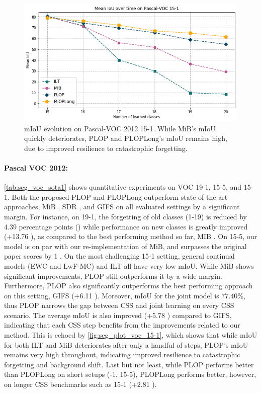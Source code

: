 


\begin{figure}
    \centering
    \includegraphics[width=0.7\linewidth]{images/seg/voc_15-1.png}
    \caption{\ac{mIoU} evolution on Pascal-VOC 2012 15-1. While MiB's \ac{mIoU} quickly
        deteriorates, PLOP and PLOPLong's \ac{mIoU} remains high, due to improved resilience to
        catastrophic forgetting.}
    \label{fig:seg_plot_voc_15-1}
\end{figure}




\paragraph{Pascal VOC 2012:} \autoref{tab:seg_voc_sota1} shows quantitative experiments on VOC 19-1,
15-5, and 15-1. Both the proposed PLOP and PLOPLong outperform state-of-the-art approaches, MiB
\citep{cermelli2020modelingthebackground}, SDR \citep{michieli2021sdr}, and GIFS
\citep{cermelli2020fewshotcontinualsegm} on all evaluated settings by a significant margin. For
instance, on 19-1, the forgetting of old classes (1-19) is reduced by 4.39 percentage points (\pp)
while performance on new classes is greatly improved (+13.76 \pp), as compared to the best
performing method so far, MIB \citep{cermelli2020modelingthebackground}. On 15-5, our model is on
par with our re-implementation of MiB, and surpasses the original paper scores
\citep{cermelli2020modelingthebackground} by 1 \pp. On the most challenging 15-1 setting, general
continual models (EWC and LwF-MC) and ILT all have very low \ac{mIoU}. While MiB shows significant
improvements, PLOP still outperforms it by a wide margin. Furthermore, PLOP also significantly
outperforms the best performing approach on this setting, GIFS
\citet{cermelli2020fewshotcontinualsegm} (+6.11 \pp). Moreover, \ac{mIoU} for the joint model is
$77.40\%$, thus PLOP narrows the gap between \ac{CSS} and joint learning on every \ac{CSS} scenario.
The average \ac{mIoU} is also improved (+5.78 \pp) compared to GIFS, indicating that each \ac{CSS}
step benefits from the improvements related to our method. This is echoed by
\autoref{fig:seg_plot_voc_15-1}, which shows that while \ac{mIoU} for both ILT and MiB deteriorates
after only a handful of steps, PLOP's \ac{mIoU} remains very high throughout, indicating improved
resilience to catastrophic forgetting and background shift. Last but not least, while PLOP performs
better than PLOPLong on short setups (-1, 15-5), PLOPLong performs better, however, on longer
\ac{CSS} benchmarks such as 15-1 (+2.81 \pp).



